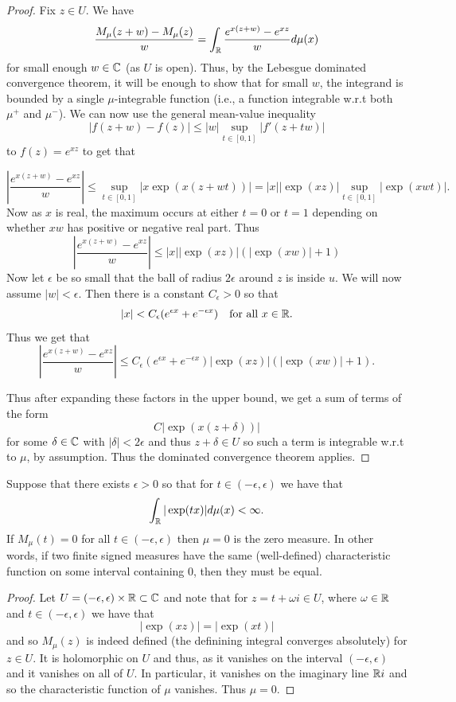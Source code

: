 \documentclass[twoside, a4paper, 10pt]{amsart}
\begin{document}
\begin{proof} Fix $z \in U$. We have $$\frac{M_{\mu}(z+w) -M_{\mu}(z)}{w} = \int_{\mathbb{R}} \frac{e^{x(z+w)}-e^{xz}}{w} d\mu(x)$$ for small enough $w \in \mathbb{C}$ (as $U$ is open).
Thus, by the Lebesgue dominated convergence theorem, it will be enough to show that for small $w$, the integrand is bounded by a single $\mu$-integrable function (i.e., a function integrable w.r.t both $\mu^+$ and $\mu^-$). We can now use the general mean-value inequality $$|f(z+w) - f(z)| \leq |w| \sup_{t \in [0,1]} |f'(z+tw)|$$ to $f(z) = e^{xz}$ to get that 

$$ \left| \frac{e^{x(z+w)}-e^{xz}}{w} \right| \leq \sup_{t \in [0,1]} |x\exp(x(z+wt))| = |x||\exp(xz)| \sup_{t \in [0,1]} |\exp(xwt)|.$$ Now as $x$ is real, the maximum occurs at either $t=0$ or $t=1$ depending on whether $xw$ has positive or negative real part. 
Thus  $$\left| \frac{e^{x(z+w)}-e^{xz}}{w} \right| \leq |x||\exp(xz)|(|\exp(xw)| + 1) $$ 
Now let $\epsilon$ be so small that the ball of radius $2\epsilon$ around $z$ is inside $u$. We will now assume $|w| < \epsilon$. Then there is a constant $C_{\epsilon}>0$ so that $$|x| < C_{\epsilon}(e^{\epsilon x} + e^{-\epsilon x}) \quad \text{for all } x \in \mathbb{R}.$$ 
Thus we get that
$$\left| \frac{e^{x(z+w)}-e^{xz}}{w} \right| \leq C_{\epsilon}(e^{\epsilon x} + e^{-\epsilon x})|\exp(xz)|(|\exp(xw)| + 1) .$$

Thus after expanding these factors in the upper bound, we get a sum of terms of the form $$C|\exp(x(z + \delta))|$$ for some $\delta \in \mathbb{C}$ with $|\delta|<2\epsilon$ and thus $z+\delta \in U$ so such a term is integrable w.r.t to $\mu$, by assumption. Thus the dominated convergence theorem applies. \end{proof}

\begin{corol} Suppose that there exists $\epsilon>0$ so that for $t \in (-\epsilon, \epsilon)$ we have that $$\int_{\mathbb{R}} |\exp(tx)| d\mu(x) < \infty.$$ If $M_{\mu}(t) = 0$ for all $t \in (-\epsilon, \epsilon)$ then $\mu = 0$ is the zero measure. In other words, if two finite signed measures have the same (well-defined) characteristic function on some interval containing $0$, then they must be equal.

\end{corol}

\begin{proof} Let $U = (-\epsilon, \epsilon) \times \mathbb{R} \subset \mathbb{C}$ and note that for $z = t+ \omega i \in U$, where $\omega \in \mathbb{R}$ and $t \in (-\epsilon, \epsilon)$ we have that $$|\exp(xz)| = |\exp(xt)|$$ and so $M_{\mu}(z)$ is indeed defined (the definining integral converges absolutely) for $z \in U$. It is holomorphic on $U$ and thus, as it vanishes on the interval $(-\epsilon, \epsilon)$ and it vanishes on all of $U$. In particular, it vanishes on the imaginary line $\mathbb{R} i$ and so the characteristic function of $\mu$ vanishes. Thus $\mu = 0$. \end{proof}
\end{document}
